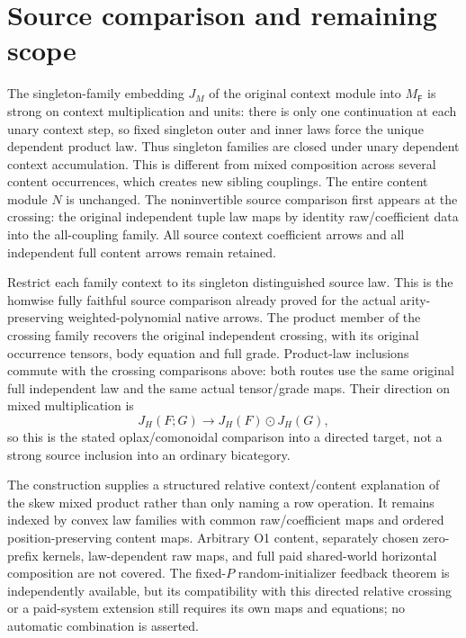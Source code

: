 \documentclass[11pt]{article}
\begin{document}
\section{Source comparison and remaining scope}
The singleton-family embedding $J_M$ of the original context module into $M_{\mathsf F}$ is strong on context multiplication and units: there is only one continuation at each unary context step, so fixed singleton outer and inner laws force the unique dependent product law. Thus singleton families are closed under unary dependent context accumulation. This is different from mixed composition across several content occurrences, which creates new sibling couplings. The entire content module $N$ is unchanged. The noninvertible source comparison first appears at the crossing: the original independent tuple law maps by identity raw/coefficient data into the all-coupling family. All source context coefficient arrows and all independent full content arrows remain retained.

Restrict each family context to its singleton distinguished source law. This is the homwise fully faithful source comparison already proved for the actual arity-preserving weighted-polynomial native arrows. The product member of the crossing family recovers the original independent crossing, with its original occurrence tensors, body equation and full grade. Product-law inclusions commute with the crossing comparisons above: both routes use the same original full independent law and the same actual tensor/grade maps. Their direction on mixed multiplication is
\[
 J_H(F;G)\longrightarrow J_H(F)\odot J_H(G),
\]
so this is the stated oplax/comonoidal comparison into a directed target, not a strong source inclusion into an ordinary bicategory.

The construction supplies a structured relative context/content explanation of the skew mixed product rather than only naming a row operation. It remains indexed by convex law families with common raw/coefficient maps and ordered position-preserving content maps. Arbitrary O1 content, separately chosen zero-prefix kernels, law-dependent raw maps, and full paid shared-world horizontal composition are not covered. The fixed-$P$ random-initializer feedback theorem is independently available, but its compatibility with this directed relative crossing or a paid-system extension still requires its own maps and equations; no automatic combination is asserted.
\end{document}
